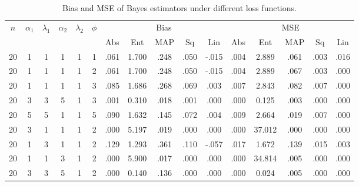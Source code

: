 \documentclass[twoside]{article}
\begin{document}
\begin{table}[H]
	\centering
	\caption{Bias and MSE of Bayes estimators under different loss functions.}
	\label{tabbayes-biase-mes1}
	
	
	\setlength{\tabcolsep}{3pt}
	\renewcommand{\arraystretch}{1.1}
	

	\footnotesize
	
	\begin{tabular}{c c c c c c | c c c c c | c c c c c}
		\hline
		$n$ & $\alpha_1$ & $\lambda_1$ & $\alpha_2$ & $\lambda_2$ & $\phi$
		& \multicolumn{5}{c|}{Bias} & \multicolumn{5}{c}{MSE} \\
		\cmidrule(lr){7-11} \cmidrule(lr){12-16}
		& & & & & & Abs & Ent & MAP & Sq & Lin & Abs & Ent & MAP & Sq & Lin \\
		\hline
		
		20 & 1 & 1 & 1 & 1 & 1 & .061 & 1.700 & .248 & .050 & -.015 & .004 & 2.889 & .061 & .003 & .016 \\
		20 & 1 & 1 & 1 & 1 & 2 & .061 & 1.700 & .248 & .050 & -.015 & .004 & 2.889 & .067 & .003 & .000 \\
		20 & 1 & 1 & 1 & 1 & 3 & .085 & 1.686 & .268 & .069 & .003 & .007 & 2.843 & .082 & .007 & .000 \\
		20 & 3 & 3 & 5 & 1 & 3 & .001 & 0.310 & .018 & .001 & .000 & .000 & 0.125 & .003 & .000 & .000 \\
		20 & 5 & 5 & 1 & 1 & 5 & .090 & 1.632 & .145 & .072 & .004 & .009 & 2.664 & .019 & .007 & .000 \\
		20 & 3 & 1 & 1 & 1 & 2 & .000 & 5.197 & .019 & .000 & .000 & .000 & 37.012 & .000 & .000 & .000 \\
		20 & 1 & 3 & 1 & 1 & 2 & .129 & 1.293 & .361 & .110 & -.057 & .017 & 1.672 & .139 & .015 & .003 \\
		20 & 1 & 1 & 3 & 1 & 2 & .000 & 5.900 & .017 & .000 & .000 & .000 & 34.814 & .005 & .000 & .000 \\
		20 & 3 & 3 & 5 & 1 & 2 & .000 & 0.140 & .136 & .000 & .000 & .000 & 0.024 & .005 & .000 & .000 \\
		
		\hline
		

\end{tabular}
\end{table}
\end{document}
